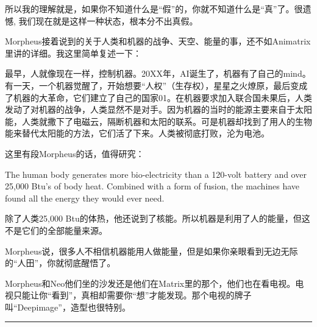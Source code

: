 \documentclass[UTF8]{ctexart}
\newcommand{\myparsep}{\noindent \rule[0.5ex]{\linewidth}{1pt}}
\begin{document}
所以我的理解就是，如果你不知道什么是“假”的，你就不知道什么是“真”了。很遗憾, 我们现在就是这样一种状态，根本分不出真假。

Morpheus接着说到的关于人类和机器的战争、天空、能量的事，还不如Animatrix里讲的详细。我这里简单复述一下：

最早，人就像现在一样，控制机器。20XX年，AI诞生了，机器有了自己的mind。有一天，一个机器觉醒了，开始想要“人权”（生存权），星星之火燎原，最后变成了机器的大革命，它们建立了自己的国家01。在机器要求加入联合国未果后，人类发动了对机器的战争，人类显然不是对手。因为机器的当时的能源主要来自于太阳能，人类就撒下了电磁云，隔断机器和太阳的联系。可是机器却找到了用人的生物能来替代太阳能的方法，它们活了下来。人类被彻底打败，沦为电池。

这里有段Morpheus的话，值得研究：

The human body generates more bio-electricity than a 120-volt battery and over 25,000 Btu's of body heat. Combined with a form of fusion, the machines have found all the energy they would ever need.

除了人类25,000 Btu的体热，他还说到了核能。所以机器是利用了人的能量，但这不是它们的全部能量来源。

Morpheus说，很多人不相信机器能用人做能量，但是如果你亲眼看到无边无际的“人田”，你就彻底醒悟了。

Morpheus和Neo他们坐的沙发还是他们在Matrix里的那个，他们也在看电视。电视只能让你“看到”，真相却需要你“想”才能发现。那个电视的牌子叫“Deepimage”，造型也很特别。

\myparsep
\end{document}
